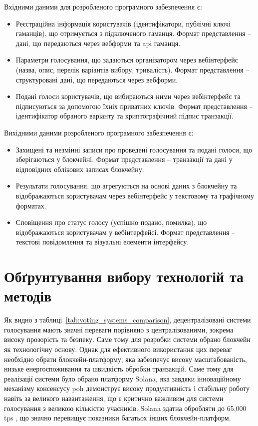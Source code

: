 \documentclass[14pt]{extreport}
\begin{document}
  Вхідними даними для розробленого програмного забезпечення є:
  
  \begin{itemize}
    \item Реєстраційна інформація користувачів (ідентифікатори, публічні ключі гаманців), що отримується з підключеного гаманця. Формат представлення – дані, що передаються через вебформи та \gls{api} гаманця.
    \item Параметри голосування, що задаються організатором через вебінтерфейс (назва, опис, перелік варіантів вибору, тривалість). Формат представлення – структуровані дані, що передаються через вебформи.
    \item Подані голоси користувачів, що вибираються ними через вебінтерфейс та підписуються за допомогою їхніх приватних ключів. Формат представлення – ідентифікатор обраного варіанту та криптографічний підпис транзакції.
  \end{itemize}
  
  Вихідними даними розробленого програмного забезпечення є:
  
  \begin{itemize}
    \item Захищені та незмінні записи про проведені голосування та подані голоси, що зберігаються у блокчейні. Формат представлення – транзакції та дані у відповідних облікових записах блокчейну.
    \item Результати голосування, що агрегуються на основі даних з блокчейну та відображаються користувачам через вебінтерфейс у текстовому та графічному форматах.
    \item Сповіщення про статус голосу (успішно подано, помилка), що відображаються користувачам у вебінтерфейсі. Формат представлення – текстові повідомлення та візуальні елементи інтерфейсу.
  \end{itemize}
  
  \section{Обґрунтування вибору технологій та методів}
  
  Як видно з таблиці~\ref{tab:voting_systems_comparison}, децентралізовані системи голосування мають значні переваги порівняно з централізованими, зокрема високу прозорість та безпеку. Саме тому для розробки системи обрано блокчейн як технологічну основу. Однак для ефективного використання цих переваг необхідно обрати блокчейн-платформу, яка забезпечує високу масштабованість, низьке енергоспоживання та швидкість обробки транзакцій. Саме тому для реалізації системи було обрано платформу Solana, яка завдяки інноваційному механізму консенсусу \gls{poh} демонструє високу продуктивність і стабільну роботу навіть за великого навантаження, що є критично важливим для системи голосування з великою кількістю учасників. Solana здатна обробляти до 65,000 \gls{tps} \cite{solana_report}, що значно перевищує показники багатьох інших блокчейн-платформ.
\end{document}
